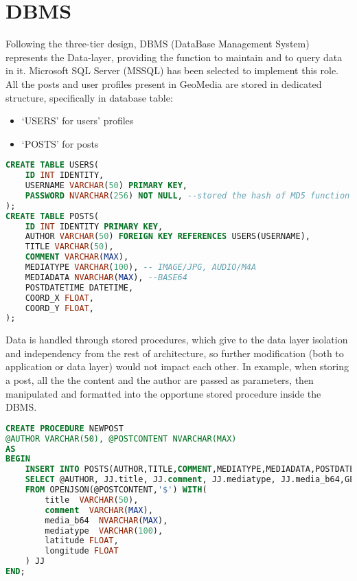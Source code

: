 \documentclass[conference]{IEEEtran}
\begin{document}
\section{DBMS}

Following the three-tier design, DBMS (DataBase Management System) represents the Data-layer, providing the function to maintain and to query data in it. Microsoft SQL Server (MSSQL)\cite{b7} has been selected to implement this role.
\\
All the posts and user profiles present in GeoMedia are stored in dedicated structure, specifically in database table:
\begin{itemize}
    \item `USERS' for users' profiles
    \item `POSTS' for posts 
\end{itemize}

\begin{lstlisting}[language=SQL, caption=Tables creation]
CREATE TABLE USERS(
    ID INT IDENTITY,
    USERNAME VARCHAR(50) PRIMARY KEY,
    PASSWORD NVARCHAR(256) NOT NULL, --stored the hash of MD5 function
);
CREATE TABLE POSTS(
	ID INT IDENTITY PRIMARY KEY,
	AUTHOR VARCHAR(50) FOREIGN KEY REFERENCES USERS(USERNAME),
	TITLE VARCHAR(50),
	COMMENT VARCHAR(MAX),
	MEDIATYPE VARCHAR(100), -- IMAGE/JPG, AUDIO/M4A
	MEDIADATA NVARCHAR(MAX), --BASE64
	POSTDATETIME DATETIME,
	COORD_X FLOAT,
	COORD_Y FLOAT,
);
\end{lstlisting}

Data is handled through stored procedures, which give to the data layer isolation and independency from the rest of architecture, so further modification (both to application or data layer) would not impact each other.
In example, when storing a post, all the the content and the author are passed as parameters, then manipulated and formatted into the opportune stored procedure inside the DBMS.

\begin{lstlisting}[language=SQL, caption=Stored Procedure of post creation]
CREATE PROCEDURE NEWPOST
@AUTHOR VARCHAR(50), @POSTCONTENT NVARCHAR(MAX)
AS
BEGIN
	INSERT INTO POSTS(AUTHOR,TITLE,COMMENT,MEDIATYPE,MEDIADATA,POSTDATETIME, LATITUDE, LONGITUDE)
	SELECT @AUTHOR, JJ.title, JJ.comment, JJ.mediatype, JJ.media_b64,GETDATE(), JJ.latitude ,JJ.longitude 
	FROM OPENJSON(@POSTCONTENT,'$') WITH(
		title  VARCHAR(50),
		comment  VARCHAR(MAX),
		media_b64  NVARCHAR(MAX),
		mediatype  VARCHAR(100),
		latitude FLOAT,
		longitude FLOAT
	) JJ
END;

\end{lstlisting}
\end{document}
